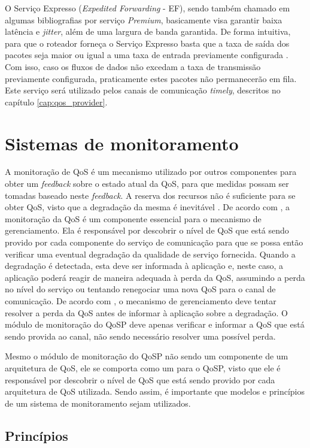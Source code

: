 	O Serviço Expresso (\textit{Expedited Forwarding} - EF), sendo também chamado em algumas bibliografias por serviço \textit{Premium}, basicamente visa garantir baixa latência e \textit{jitter}, além de uma largura de banda garantida. De forma intuitiva, para que o roteador forneça o Serviço Expresso basta que a taxa de saída dos pacotes seja maior ou igual a uma taxa de entrada previamente configurada \cite{BBCDWW98}. Com isso, caso os fluxos de dados não excedam a taxa de transmissão previamente configurada, praticamente estes pacotes não permanecerão em fila. Este serviço será utilizado pelos canais de comunicação \textit{timely}, descritos no capítulo \ref{cap:qos_provider}.
\section{Sistemas de monitoramento}	
	
	A monitoração de QoS é um mecanismo utilizado por outros componentes para obter um \textit{feedback} sobre o estado atual da QoS, para que medidas possam ser tomadas baseado neste \textit{feedback}. A reserva dos recursos não é suficiente para se obter QoS, visto que a degradação da mesma é inevitável \cite{JTK00}. De acordo com \cite{ACH96}, a monitoração da QoS é um componente essencial para o mecanismo de gerenciamento. Ela é responsável por descobrir o nível de QoS que está sendo provido por cada componente do serviço de comunicação para que se possa então verificar uma eventual degradação da qualidade de serviço fornecida. Quando a degradação é detectada, esta deve ser informada à aplicação e, neste caso, a aplicação poderá reagir de maneira adequada à perda da QoS, assumindo a perda no nível do serviço ou tentando renegociar uma nova QoS para o canal de comunicação. De acordo com \cite{ACH96}, o mecanismo de gerenciamento deve tentar resolver a perda da QoS antes de informar à aplicação sobre a degradação. O módulo de monitoração do QoSP deve apenas verificar e informar a QoS que está sendo provida ao canal, não sendo necessário resolver uma possível perda.
	
	Mesmo o módulo de monitoração do QoSP não sendo um componente de um arquitetura de QoS, ele se comporta como um para o QoSP, visto que ele é responsável por descobrir o nível de QoS que está sendo provido por cada arquitetura de QoS utilizada. Sendo assim, é importante que modelos e princípios de um sistema de monitoramento sejam utilizados.
	
\subsection{Princípios} %

